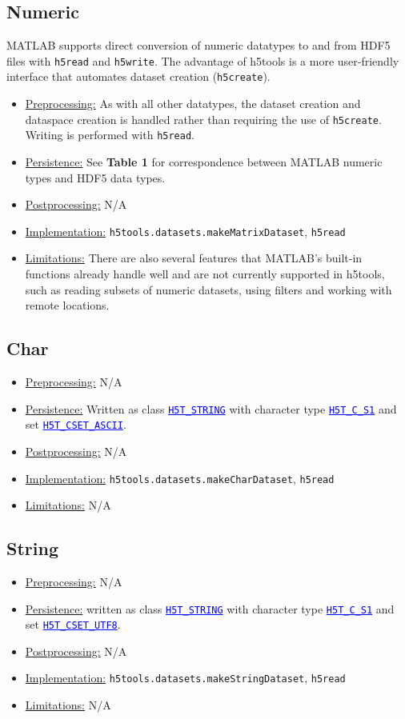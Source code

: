 \documentclass[11pt]{exam}
\newcommand\myurl[1]{\textcolor{blue}{\underline{#1}}}
\newcommand\myfcn[1]{\colorbox{codegray}{\textcolor{codeblue}{\texttt{#1}}}}
\newcommand\matfcn[1]{\textcolor{darkteal}{\texttt{#1}}}
\newcommand\hdftype[1]{\texttt{\myurl{#1}}}
\begin{document}
        \subsection{Numeric}
        \noindent MATLAB supports direct conversion of numeric datatypes to and from HDF5 files with \matfcn{h5read} and \matfcn{h5write}. The advantage of h5tools is a more user-friendly interface that automates dataset creation (\matfcn{h5create}).
        \begin{itemize}
	        \item \underline{Preprocessing:} As with all other datatypes, the dataset creation and dataspace creation is handled rather than requiring the use of \matfcn{h5create}. Writing is performed with \matfcn{h5read}.
	        \item \underline{Persistence:} See \textbf{Table 1} for correspondence between MATLAB numeric types and HDF5 data types.
	        \item \underline{Postprocessing:} N/A
			\item \underline{Implementation:} \myfcn{h5tools.datasets.makeMatrixDataset}, \matfcn{h5read}
			\item \underline{Limitations:} There are also several features that MATLAB's built-in functions already handle well and are not currently supported in h5tools, such as reading subsets of numeric datasets, using filters and working with remote locations. 
	    \end{itemize}
		
		\subsection{Char}
		\noindent\begin{itemize}
			\item \underline{Preprocessing:} N/A 
			\item \underline{Persistence:} Written as class \hdftype{H5T\_STRING} with character type \hdftype{H5T\_C\_S1} and set \hdftype{H5T\_CSET\_ASCII}.
			\item \underline{Postprocessing:} N/A
			\item \underline{Implementation:} \myfcn{h5tools.datasets.makeCharDataset}, \matfcn{h5read}
			\item \underline{Limitations:} N/A
		\end{itemize}

		\subsection{String}
		\noindent\begin{itemize}
			\item \underline{Preprocessing:} N/A
			\item \underline{Persistence:} written as class \hdftype{H5T\_STRING} with character type \hdftype{H5T\_C\_S1} and set \hdftype{H5T\_CSET\_UTF8}.
			\item \underline{Postprocessing:} N/A
			\item \underline{Implementation:} \myfcn{h5tools.datasets.makeStringDataset}, \matfcn{h5read}
			\item \underline{Limitations:} N/A
		\end{itemize}
		
\end{document}
